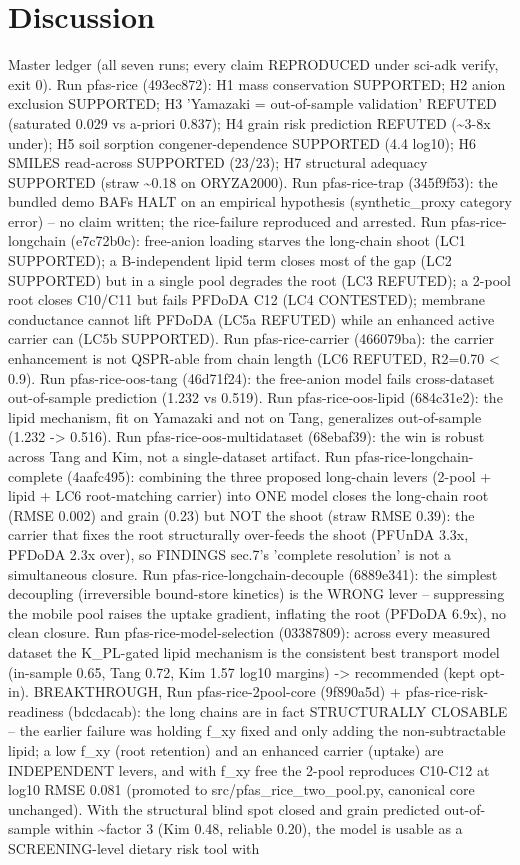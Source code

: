 \documentclass{article}
\begin{document}
\section{Discussion}
Master ledger (all seven runs; every claim REPRODUCED under sci-adk verify, exit 0). Run pfas-rice (493ec872): H1 mass conservation SUPPORTED; H2 anion exclusion SUPPORTED; H3 'Yamazaki = out-of-sample validation' REFUTED (saturated 0.029 vs a-priori 0.837); H4 grain risk prediction REFUTED (\textasciitilde{}3-8x under); H5 soil sorption congener-dependence SUPPORTED (4.4 log10); H6 SMILES read-across SUPPORTED (23/23); H7 structural adequacy SUPPORTED (straw \textasciitilde{}0.18 on ORYZA2000). Run pfas-rice-trap (345f9f53): the bundled demo BAFs HALT on an empirical hypothesis (synthetic\_proxy category error) -- no claim written; the rice-failure reproduced and arrested. Run pfas-rice-longchain (e7c72b0c): free-anion loading starves the long-chain shoot (LC1 SUPPORTED); a B-independent lipid term closes most of the gap (LC2 SUPPORTED) but in a single pool degrades the root (LC3 REFUTED); a 2-pool root closes C10/C11 but fails PFDoDA C12 (LC4 CONTESTED); membrane conductance cannot lift PFDoDA (LC5a REFUTED) while an enhanced active carrier can (LC5b SUPPORTED). Run pfas-rice-carrier (466079ba): the carrier enhancement is not QSPR-able from chain length (LC6 REFUTED, R2=0.70 < 0.9). Run pfas-rice-oos-tang (46d71f24): the free-anion model fails cross-dataset out-of-sample prediction (1.232 vs 0.519). Run pfas-rice-oos-lipid (684c31e2): the lipid mechanism, fit on Yamazaki and not on Tang, generalizes out-of-sample (1.232 -> 0.516). Run pfas-rice-oos-multidataset (68ebaf39): the win is robust across Tang and Kim, not a single-dataset artifact. Run pfas-rice-longchain-complete (4aafc495): combining the three proposed long-chain levers (2-pool + lipid + LC6 root-matching carrier) into ONE model closes the long-chain root (RMSE 0.002) and grain (0.23) but NOT the shoot (straw RMSE 0.39): the carrier that fixes the root structurally over-feeds the shoot (PFUnDA 3.3x, PFDoDA 2.3x over), so FINDINGS sec.7's 'complete resolution' is not a simultaneous closure. Run pfas-rice-longchain-decouple (6889e341): the simplest decoupling (irreversible bound-store kinetics) is the WRONG lever -- suppressing the mobile pool raises the uptake gradient, inflating the root (PFDoDA 6.9x), no clean closure. Run pfas-rice-model-selection (03387809): across every measured dataset the K\_PL-gated lipid mechanism is the consistent best transport model (in-sample 0.65, Tang 0.72, Kim 1.57 log10 margins) -> recommended (kept opt-in). BREAKTHROUGH, Run pfas-rice-2pool-core (9f890a5d) + pfas-rice-risk-readiness (bdcdacab): the long chains are in fact STRUCTURALLY CLOSABLE -- the earlier failure was holding f\_xy fixed and only adding the non-subtractable lipid; a low f\_xy (root retention) and an enhanced carrier (uptake) are INDEPENDENT levers, and with f\_xy free the 2-pool reproduces C10-C12 at log10 RMSE 0.081 (promoted to src/pfas\_rice\_two\_pool.py, canonical core unchanged). With the structural blind spot closed and grain predicted out-of-sample within \textasciitilde{}factor 3 (Kim 0.48, reliable 0.20), the model is usable as a SCREENING-level dietary risk tool with 
\end{document}
